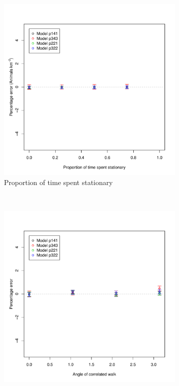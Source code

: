 \documentclass[a4paper,10pt,reqno,oneside]{amsart}
\begin{document}
\begin{figure}[t]
        \centering
        \begin{subfigure}[t]{0.5\textwidth}
                \centering
		\includegraphics[width=1\textwidth]{imgs/ResultsPerching.pdf}
                \caption{Proportion of time spent stationary}
                \label{f:Perch}
        \end{subfigure}
        ~ 
	\begin{subfigure}[t]{0.5\textwidth}
                \centering
		\includegraphics[width=1\textwidth]{imgs/ResultsTort.pdf}

\end{subfigure}
\end{figure}
\end{document}
